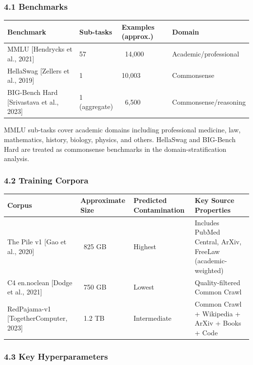 
\subsubsection{4.1 Benchmarks}

\begin{table}[htbp]
\centering
\begin{tabular}{llll}
\toprule
Benchmark & Sub-tasks & Examples (approx.) & Domain \\
\midrule
MMLU [Hendrycks et al., 2021] & 57 & ~14,000 & Academic/professional \\
HellaSwag [Zellers et al., 2019] & 1 & 10,003 & Commonsense \\
BIG-Bench Hard [Srivastava et al., 2023] & 1 (aggregate) & ~6,500 & Commonsense/reasoning \\
\bottomrule
\end{tabular}
\end{table}

MMLU sub-tasks cover academic domains including professional medicine, law, mathematics, history, biology, physics, and others. HellaSwag and BIG-Bench Hard are treated as commonsense benchmarks in the domain-stratification analysis.

\subsubsection{4.2 Training Corpora}

\begin{table}[htbp]
\centering
\begin{tabular}{llll}
\toprule
Corpus & Approximate Size & Predicted Contamination & Key Source Properties \\
\midrule
The Pile v1 [Gao et al., 2020] & ~825 GB & Highest & Includes PubMed Central, ArXiv, FreeLaw (academic-weighted) \\
C4 en.noclean [Dodge et al., 2021] & ~750 GB & Lowest & Quality-filtered Common Crawl \\
RedPajama-v1 [TogetherComputer, 2023] & ~1.2 TB & Intermediate & Common Crawl + Wikipedia + ArXiv + Books + Code \\
\bottomrule
\end{tabular}
\end{table}

\subsubsection{4.3 Key Hyperparameters}

